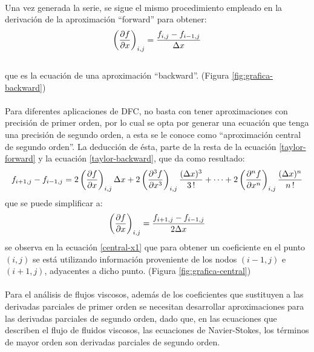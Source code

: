 \documentclass[letterpaper, openright, 12pt]{book}
\begin{document}
\paragraph{}
    Una vez generada la serie, se sigue el mismo procedimiento empleado en la
    derivación de la aproximación ``forward'' para obtener:
    \begin{equation}
    \left( \pdv{f}{x} \right)_{i,j} = \frac{f_{i,j} - f_{i-1,j}}{\Delta x}
    \label{backward-x1}
    \end{equation}
    \\que es la ecuación de una aproximación ``backward''. (Figura \ref{fig:grafica-backward})

    \paragraph*{}
    Para diferentes aplicaciones de DFC, no basta con tener aproximaciones con
    precisión de primer orden, por lo cual se opta por generar una ecuación que
    tenga una precisión de segundo orden, a esta se le conoce como
    ``aproximación central de segundo orden''. La deducción de ésta, parte de la
    resta de la ecuación \ref{taylor-forward} y la ecuación \ref{taylor-backward},
    que da como resultado:
    \begin{equation}
    f_{i+1,j} - f_{i-1, j} = 2 \left( \pdv{f}{x} \right)_{i,j} \Delta x + 2 \left( \pdv[3]{f}{x} \right)_{i,j} \frac{(\Delta x)^3}{3 \,!} + \dotsb + 2 \left( \pdv[n]{f}{x} \right)_{i,j} \frac{(\Delta x)^n}{n\,!}
    \end{equation}
    que se puede simplificar a:\\
    \begin{equation}
    \left( \pdv{f}{x} \right)_{i,j} = \frac{f_{i+1,j} - f_{i-1,j}}{2 \Delta x}
    \label{central-x1}
    \end{equation}
    se observa en la ecuación \ref{central-x1} que para obtener un coeficiente
    en el punto $(i,j)$ se está utilizando información proveniente de los nodos
    $(i-1, j)$ e $(i+1, j)$, adyacentes a dicho punto. (Figura \ref{fig:grafica-central})

    \paragraph*{}
    Para el análisis de flujos viscosos, además de los coeficientes que sustituyen
    a las derivadas parciales de primer orden se necesitan desarrollar
    aproximaciones para las derivadas parciales de segundo orden, dado que, en
    las ecuaciones que describen el flujo de fluidos viscosos, las ecuaciones de
    Navier-Stokes, los términos de mayor orden son derivadas parciales de
    segundo orden.
\end{document}
